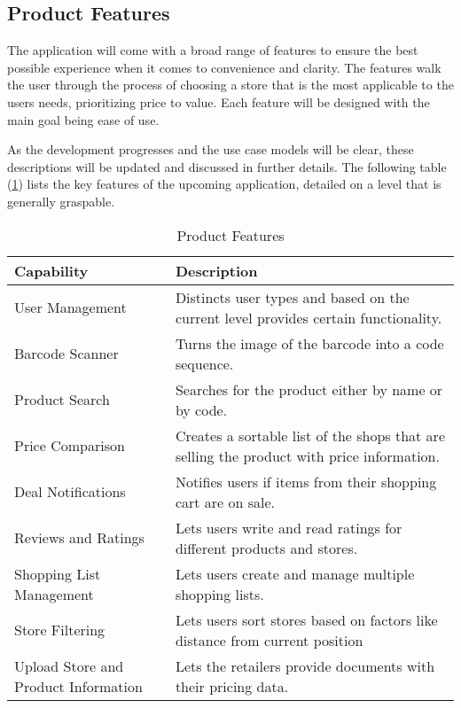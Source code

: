 \subsection{Product Features}

The application will come with a broad range of features to ensure the best possible experience when it comes to convenience and clarity. The features walk the user through the process of choosing a store that is the most applicable to the users needs, prioritizing price to value. Each feature will be designed with the main goal being ease of use.

As the development progresses and the use case models will be clear, these descriptions will be updated and discussed in further details. The following table (\ref{tab:features}) lists the key features of the upcoming application, detailed on a level that is generally graspable.

\begin{table}[ht]
	\centering
	\begin{tabularx}{\textwidth}{|p{2.5cm}|X|}
		\hline
		\textbf{Capability} & \textbf{Description} \\ 
		\hline
		User Management & Distincts user types and based on the current level provides certain functionality. \\ 
		\hline
		Barcode Scanner & Turns the image of the barcode into a code sequence. \\ 
		\hline
		Product Search & Searches for the product either by name or by code. \\ 
		\hline
		Price Comparison & Creates a sortable list of the shops that are selling the product with price information. \\ 
		\hline
		Deal Notifications & Notifies users if items from their shopping cart are on sale.\\ 
		\hline
		Reviews and Ratings & Lets users write and read ratings for different products and stores. \\ 
		\hline
		Shopping List Management & Lets users create and manage multiple shopping lists. \\ 
		\hline
		Store Filtering & Lets users sort stores based on factors like distance from current position \\ 
		\hline
		Upload Store and Product Information & Lets the retailers provide documents with their pricing data. \\ 
		\hline
	\end{tabularx}
	\caption{Product Features}
	\label{tab:features}
\end{table}

